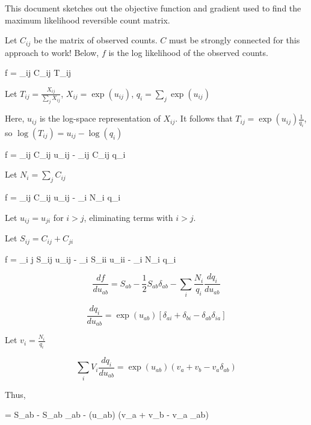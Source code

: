 \documentclass[12pt]{article}
\let\[\equation
\let\]\endequation
\begin{document}
This document sketches out the objective function and gradient used to find the maximum likelihood reversible count matrix.  

Let $C_{ij}$ be the matrix of observed counts.  $C$ must be strongly connected for this approach to work!  Below, $f$ is the log likelihood of the observed counts.

\[
f = \sum_{ij} C_{ij} \log T_{ij}
\]



Let $T_{ij} = \frac{X_{ij}}{\sum_j X_{ij}}$, $X_{ij} =  \exp(u_{ij})$, $q_i = \sum_j \exp(u_{ij})$

Here, $u_{ij}$ is the log-space representation of $X_{ij}$.  It follows that $T_{ij} = \exp(u_{ij}) \frac{1}{q_i}$, so $\log(T_{ij}) = u_{ij} - \log(q_{i})$

\[f = \sum_{ij} C_{ij} u_{ij} - \sum_{ij} C_{ij} \log q_i\]

Let $N_i = \sum_j C_{ij}$

\[f = \sum_{ij} C_{ij} u_{ij} - \sum_{i} N_i \log q_i\]

Let $u_{ij} = u_{ji}$ for $i > j$, eliminating terms with $i>j$.

Let $S_{ij} = C_{ij} + C_{ji}$

\[f = \sum_{i \le j} S_{ij} u_{ij} -  \sum_i S_{ii} u_{ii} - \sum_i N_i \log q_i\]


$$\frac{df}{du_{ab}} = S_{ab}  - \frac{1}{2} S_{ab} \delta_{ab} - \sum_i \frac{N_i}{q_i} \frac{dq_i}{du_{ab}}$$

$$\frac{dq_i}{du_{ab}} = \exp(u_{ab}) [\delta_{ai} + \delta_{bi} - \delta_{ab} \delta_{ia}]$$

Let $v_i = \frac{N_i}{q_i}$

$$ \sum_i V_i \frac{dq_i}{du_{ab}} = \exp(u_{ab}) (v_a + v_b - v_a \delta_{ab})$$ 

Thus,

\[ = S_{ab} -  S_{ab} \delta_{ab} - \exp(u_{ab}) (v_a + v_b - v_a \delta_{ab})\]
\end{document}
